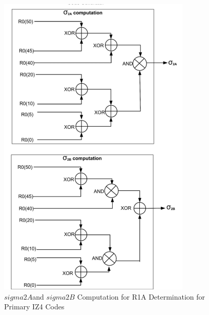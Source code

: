 \begin{figure}[h]
    \centering
    \includegraphics[width=\columnwidth]{figs/fig9.png}
    \captionsetup{justification=centering}
     \caption{$sigma2A$and $sigma2B$ Computation for R1A Determination for Primary IZ4 Codes}
    \label{fig:sigma2A_and_sigma2B_computation}
\end{figure}

